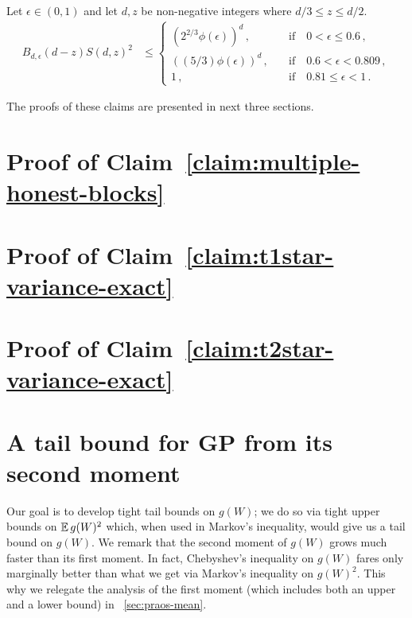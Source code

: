 \begin{claim}\label{claim:t2star-variance-exact}
  Let $\epsilon \in (0,1)$ and 
  let $d,z$ be non-negative integers where $d/3 \leq z \leq d/2$. 
  \begin{align*}
    B_{d, \epsilon}(d-z) S(d,z)^2
    &\leq \begin{cases} 
    \left( 2^{2/3} \phi(\epsilon) \right)^d \,,
        &\quad\text{if}\quad 0 < \epsilon \leq 0.6\,, \\
    \left( (5/3) \phi(\epsilon)  \right)^d \,,
        &\quad\text{if}\quad 0.6 < \epsilon < 0.809\,, \\
    1 \,,
        &\quad\text{if}\quad 0.81 \leq \epsilon < 1
        \,.
    \end{cases}
  \end{align*}
\end{claim}



The proofs of these claims are presented in next three sections.





\section{Proof of Claim~\ref{claim:multiple-honest-blocks}}\label{sec:praos-claim-multiple-honest-blocks}



\section{Proof of Claim~\ref{claim:t1star-variance-exact}}\label{sec:praos-claim-t1star-variance-exact}



\section{Proof of Claim~\ref{claim:t2star-variance-exact}}\label{sec:praos-claim-t2star-variance-exact}













\section{A tail bound for GP from its second moment}
Our goal is to develop tight tail bounds on $g(W)$; 
we do so via tight upper bounds on $\operatorname{\mathbb{E}} g(W)^2$ 
which, when used in Markov's inequality, 
would give us a tail bound on $g(W)$. 
We remark that the second moment of $g(W)$ grows 
much faster than its first moment. In fact, 
Chebyshev's inequality on $g(W)$ 
fares only marginally better 
than what we get via Markov's inequality on $g(W)^2$. 
This why we relegate the analysis of the first moment 
(which includes both an upper and a lower bound)
in \Section~\ref{sec:praos-mean}.

